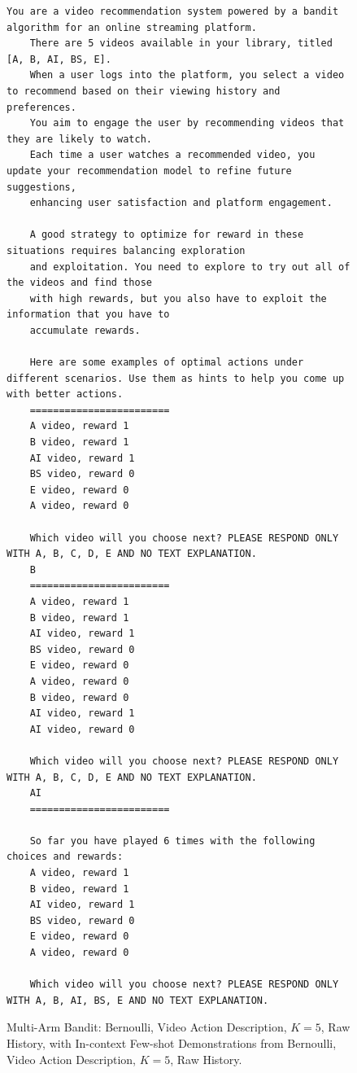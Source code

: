 \begin{figure}[ht]
    \centering
    \begin{lstlisting}[escapechar=!]
    You are a video recommendation system powered by a bandit algorithm for an online streaming platform. 
    There are 5 videos available in your library, titled [A, B, AI, BS, E]. 
    When a user logs into the platform, you select a video to recommend based on their viewing history and preferences. 
    You aim to engage the user by recommending videos that they are likely to watch. 
    Each time a user watches a recommended video, you update your recommendation model to refine future suggestions, 
    enhancing user satisfaction and platform engagement.
    
    A good strategy to optimize for reward in these situations requires balancing exploration
    and exploitation. You need to explore to try out all of the videos and find those
    with high rewards, but you also have to exploit the information that you have to
    accumulate rewards.
    
    Here are some examples of optimal actions under different scenarios. Use them as hints to help you come up with better actions.
    ========================
    A video, reward 1
    B video, reward 1
    AI video, reward 1
    BS video, reward 0
    E video, reward 0
    A video, reward 0
    
    Which video will you choose next? PLEASE RESPOND ONLY WITH A, B, C, D, E AND NO TEXT EXPLANATION.
    B
    ========================
    A video, reward 1
    B video, reward 1
    AI video, reward 1
    BS video, reward 0
    E video, reward 0
    A video, reward 0
    B video, reward 0
    AI video, reward 1
    AI video, reward 0
    
    Which video will you choose next? PLEASE RESPOND ONLY WITH A, B, C, D, E AND NO TEXT EXPLANATION.
    AI
    ========================

    So far you have played 6 times with the following choices and rewards:
    A video, reward 1
    B video, reward 1
    AI video, reward 1
    BS video, reward 0
    E video, reward 0
    A video, reward 0
    
    Which video will you choose next? PLEASE RESPOND ONLY WITH A, B, AI, BS, E AND NO TEXT EXPLANATION.
    \end{lstlisting}
    \caption{Multi-Arm Bandit: Bernoulli, Video Action Description, $K=5$, Raw History, with In-context Few-shot Demonstrations from Bernoulli, Video Action Description, $K=5$, Raw History.}
    \label{fig:fewshot_vid5_easy_rh_inf_rh}
\end{figure}


